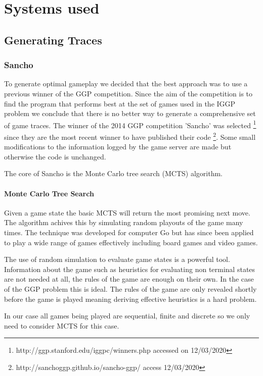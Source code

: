 \chapter{Systems used}
\section{Generating Traces}
\subsection{Sancho}
To generate optimal gameplay we decided that the best approach was to use a previous winner of the GGP competition. Since the aim of the competition is to find the program that performs best at the set of games used in the IGGP problem we conclude that there is no better way to generate a comprehensive set of game traces. The winner of the 2014 GGP competition 'Sancho' was selected \footnote{http://ggp.stanford.edu/iggpc/winners.php accessed on 12/03/2020} since they are the most recent winner to have published their code \footnote{http://sanchoggp.github.io/sancho-ggp/ access 12/03/2020}. Some small modifications to the information logged by the game server are made but otherwise the code is unchanged.

The core of Sancho is the Monte Carlo tree search (MCTS) algorithm.

\subsubsection{Monte Carlo Tree Search}
Given a game state the basic MCTS will return the most promising next move. The algorithm achives this by simulating random playouts of the game many times. The technique was developed for computer Go but has since been applied to play a wide range of games effectively including board games and video games\cite{Silver/MCTS}\cite{Chaslot/MCTS}.

The use of random simulation to evaluate game states is a powerful tool. Information about the game such as heuristics for evaluating non terminal states are not needed at all, the rules of the game are enough on their own. In the case of the GGP problem this is ideal. The rules of the game are only revealed shortly before the game is played meaning deriving effective heuristics is a hard problem.

In our case all games being played are sequential, finite and discrete so we only need to consider MCTS for this case.

